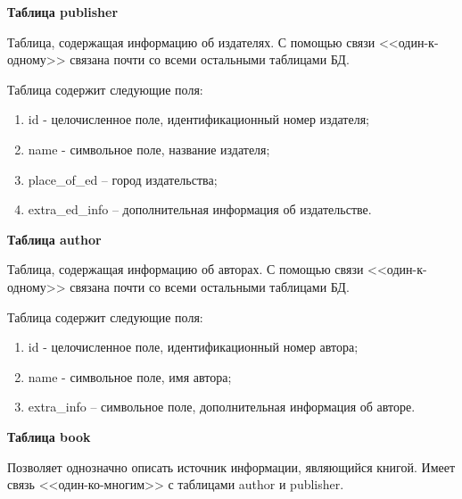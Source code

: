 \hfill \break

{\bf Таблица publisher}

Таблица, содержащая информацию об издателях. С помощью связи <<один-к-одному>> связана почти со всеми остальными таблицами БД.

Таблица содержит следующие поля:
\begin{enumerate}
	\item id - целочисленное поле, идентификационный номер издателя;
	\item name - символьное поле, название издателя;
	\item place\_of\_ed – город издательства;
	\item extra\_ed\_info  – дополнительная информация об издательстве.
\end{enumerate}

\hfill \break

{\bf Таблица author}

Таблица, содержащая информацию об авторах. С помощью связи <<один-к-одному>> связана почти со всеми остальными таблицами БД.

Таблица содержит следующие поля:
\begin{enumerate}
	\item id - целочисленное поле, идентификационный номер автора;
	\item name - символьное поле, имя автора;
	\item extra\_info – символьное поле, дополнительная информация об авторе.
\end{enumerate}

\hfill \break

{\bf Таблица book}

Позволяет однозначно описать источник информации, являющийся книгой. Имеет связь <<один-ко-многим>> с таблицами author и publisher. 


